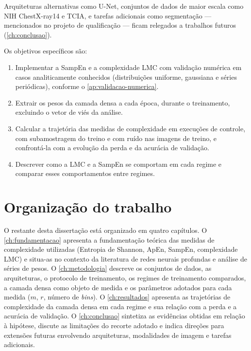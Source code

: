 Arquiteturas alternativas como U-Net, conjuntos de dados de maior escala
como NIH ChestX-ray14 e TCIA, e tarefas adicionais como segmentação ---
mencionados no projeto de qualificação --- ficam relegados a trabalhos
futuros (\autoref{ch:conclusao}).

Os objetivos específicos são:

\begin{enumerate}
  \item Implementar a SampEn e a complexidade LMC com
        validação numérica em casos analiticamente conhecidos
        (distribuições uniforme, gaussiana e séries periódicas), conforme
        o \autoref{ap:validacao-numerica}.
  \item Extrair os pesos da camada densa a cada época, durante o
        treinamento, excluindo o vetor de viés da análise.
  \item Calcular a trajetória das medidas de complexidade em execuções
        de controle, com subamostragem do treino e com ruído nas imagens
        de treino, e confrontá-la com a evolução da perda e da acurácia
        de validação.
  \item Descrever como a LMC e a SampEn se comportam em cada regime e
        comparar esses comportamentos entre regimes.
\end{enumerate}

\section{Organização do trabalho}
\label{sec:intro-organizacao}

O restante desta dissertação está organizado em quatro capítulos. O
\autoref{ch:fundamentacao} apresenta a fundamentação teórica das
medidas de complexidade utilizadas (Entropia de Shannon, ApEn, SampEn,
complexidade LMC) e situa-as no contexto da literatura
de redes neurais profundas e análise de séries de pesos. O
\autoref{ch:metodologia} descreve os conjuntos de dados, as arquiteturas,
o protocolo de treinamento, os regimes de treinamento comparados,
a camada densa como objeto de medida e os parâmetros adotados
para cada medida ($m$, $r$, número de \emph{bins}). O
\autoref{ch:resultados} apresenta as trajetórias de complexidade da
camada densa em cada regime e sua relação com a perda e a acurácia de
validação. O
\autoref{ch:conclusao} sintetiza as evidências obtidas em relação à
hipótese, discute as limitações do recorte adotado e indica
direções para extensões futuras envolvendo arquiteturas, modalidades
de imagem e tarefas adicionais.

